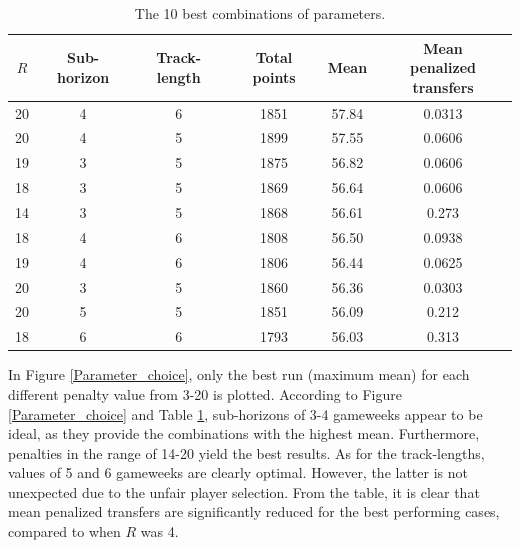 \begin{table}[!htb]
\centering
\begin{tabular}{|c|c|c|c|c|c|}
\hline
$R$ & Sub-horizon & Track-length & Total points & Mean & \makecell{Mean \\ penalized transfers} \\
\hline
20 \Tstrut      & 4       & 6                & 1851         & 57.84 & 0.0313 \\
20      & 4       & 5                & 1899         & 57.55 & 0.0606 \\
19      & 3       & 5                & 1875         & 56.82 & 0.0606 \\
18      & 3       & 5                & 1869         & 56.64 & 0.0606 \\
14      & 3       & 5                & 1868         & 56.61 & 0.273  \\
18      & 4       & 6                & 1808         & 56.50 & 0.0938 \\
19      & 4       & 6                & 1806         & 56.44 & 0.0625 \\
20      & 3       & 5                & 1860         & 56.36 & 0.0303 \\
20      & 5       & 5                & 1851         & 56.09 & 0.212  \\
18   \Bstrut    & 6       & 6                & 1793         & 56.03 & 0.313  \\
\hline
\end{tabular}
\caption{The 10 best combinations of parameters.}
\label{tab:top_10}
\end{table}


In Figure \ref{Parameter_choice}, only the best run (maximum mean) for each different penalty value from 3-20 is plotted. According to Figure \ref{Parameter_choice} and Table \ref{tab:top_10}, sub-horizons of 3-4 gameweeks appear to be ideal, as they provide the combinations with the highest mean. Furthermore, penalties in the range of 14-20 yield the best results. As for the track-lengths, values of 5 and 6 gameweeks are clearly optimal. However, the latter is not unexpected due to the unfair player selection. From the table, it is clear that mean penalized transfers are significantly reduced for the best performing cases, compared to when $R$ was 4.

\newpar



\FloatBarrier

